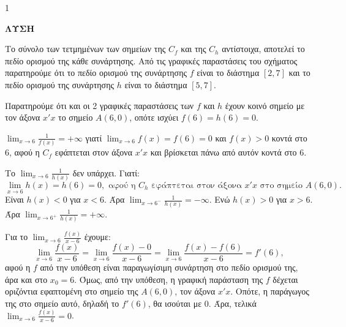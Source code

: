 \begin{ylh}{1}
    \item [Ύλη από εικόνα]
\end{ylh}
\begin{center}
    \textbf{\Large ΛΥΣΗ}
\end{center}

\begin{alist}
    \item Το σύνολο των τετμημένων των σημείων της $C_f$ και της $C_h$ αντίστοιχα, αποτελεί το πεδίο ορισμού της κάθε συνάρτησης. Από τις γραφικές παραστάσεις του σχήματος παρατηρούμε ότι το πεδίο ορισμού της συνάρτησης $f$ είναι το διάστημα $[2,7]$ και το πεδίο ορισμού της συνάρτησης $h$ είναι το διάστημα $[5,7]$.
    \item Παρατηρούμε ότι και οι 2 γραφικές παραστάσεις των $f$ και $h$ έχουν κοινό σημείο με τον άξονα $x'x$ το σημείο $A(6,0)$, οπότε ισχύει $f(6) = h(6) = 0$.
    \begin{rlist}
        \item $\lim_{x \to 6} \frac{1}{f(x)} = +\infty$ γιατί $\lim_{x \to 6} f(x) = f(6) = 0$ και $f(x) > 0$ κοντά στο 6, αφού η $C_f$ εφάπτεται στον άξονα $x'x$ και βρίσκεται πάνω από αυτόν κοντά στο 6.
        \item Το $\lim_{x \to 6} \frac{1}{h(x)}$ δεν υπάρχει. Γιατί:
        \[ \lim_{x \to 6} h(x) = h(6) = 0, \text{ αφού η } C_h \text{ εφάπτεται στον άξονα } x'x \text{ στο σημείο } A(6,0). \]
        Είναι $h(x) < 0$ για $x < 6$. Άρα $\lim_{x \to 6^-} \frac{1}{h(x)} = -\infty$.
        Ενώ $h(x) > 0$ για $x > 6$. Άρα $\lim_{x \to 6^+} \frac{1}{h(x)} = +\infty$.
        \item Για το $\lim_{x \to 6} \frac{f(x)}{x-6}$ έχουμε:
        \[ \lim_{x \to 6} \frac{f(x)}{x-6} = \lim_{x \to 6} \frac{f(x)-0}{x-6} = \lim_{x \to 6} \frac{f(x)-f(6)}{x-6} = f'(6), \]
        αφού η $f$ από την υπόθεση είναι παραγωγίσιμη συνάρτηση στο πεδίο ορισμού της, άρα και στο $x_0 = 6$.
        Όμως, από την υπόθεση, η γραφική παράσταση της $f$ δέχεται οριζόντια εφαπτομένη στο σημείο της $A(6,0)$, τον άξονα $x'x$. Οπότε, η παράγωγος της στο σημείο αυτό, δηλαδή το $f'(6)$, θα ισούται με 0.
        Άρα, τελικά $\lim_{x \to 6} \frac{f(x)}{x-6} = 0$.
    \end{rlist}
\end{alist}